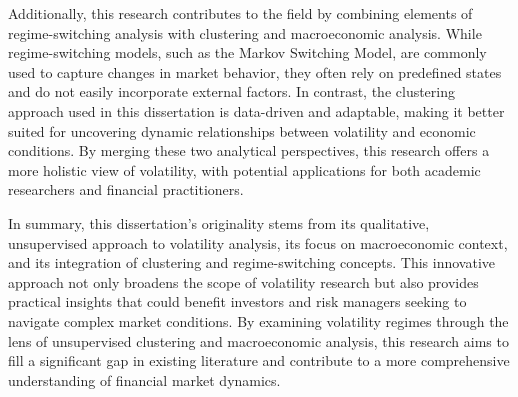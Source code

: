 Additionally, this research contributes to the field by combining elements of regime-switching analysis with clustering and macroeconomic analysis. While regime-switching models, such as the Markov Switching Model, are commonly used to capture changes in market behavior, they often rely on predefined states and do not easily incorporate external factors. In contrast, the clustering approach used in this dissertation is data-driven and adaptable, making it better suited for uncovering dynamic relationships between volatility and economic conditions. By merging these two analytical perspectives, this research offers a more holistic view of volatility, with potential applications for both academic researchers and financial practitioners.

In summary, this dissertation’s originality stems from its qualitative, unsupervised approach to volatility analysis, its focus on macroeconomic context, and its integration of clustering and regime-switching concepts. This innovative approach not only broadens the scope of volatility research but also provides practical insights that could benefit investors and risk managers seeking to navigate complex market conditions. By examining volatility regimes through the lens of unsupervised clustering and macroeconomic analysis, this research aims to fill a significant gap in existing literature and contribute to a more comprehensive understanding of financial market dynamics.





